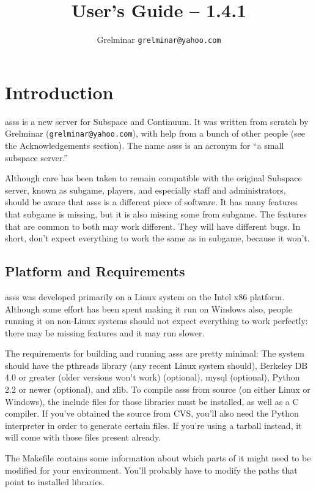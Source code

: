 \documentclass{article}
\title{\asss{} User's Guide -- 1.4.1}
\author{\small Grelminar \lt{}\texttt{grelminar@yahoo.com}\gt{}}
\newcommand{\asss}{asss}
\newcommand{\subgame}{subgame}
\begin{document}
\maketitle

\section{Introduction}

\asss{} is a new server for Subspace and Continuum. It was written from
scratch by Grelminar (\verb/grelminar@yahoo.com/), with help from a
bunch of other people (see the Acknowledgements section). The name
\asss{} is an acronym for ``a small subspace server.''

Although care has been taken to remain compatible with the original
Subspace server, known as \subgame{}, players, and especially staff and
administrators, should be aware that \asss{} is a different piece of
software. It has many features that \subgame{} is missing, but it is
also missing some from \subgame{}. The features that are common to both
may work different. They will have different bugs. In short, don't
expect everything to work the same as in \subgame{}, because it won't.

\subsection{Platform and Requirements}

\asss{} was developed primarily on a Linux system on the Intel x86
platform. Although some effort has been spent making it run on Windows
also, people running it on non-Linux systems should not expect
everything to work perfectly: there may be missing features and it may
run slower.

The requirements for building and running \asss{} are pretty minimal:
The system should have the pthreads library (any recent Linux system
should), Berkeley DB 4.0 or greater (older versions won't work)
(optional), mysql (optional), Python 2.2 or newer (optional), and zlib.
To compile \asss{} from source (on either Linux or Windows), the include
files for those libraries must be installed, as well as a C compiler. If
you've obtained the source from CVS, you'll also need the Python
interpreter in order to generate certain files. If you're using a
tarball instead, it will come with those files present already.

The Makefile contains some information about which parts of it might
need to be modified for your environment. You'll probably have to modify
the paths that point to installed libraries.
\end{document}
